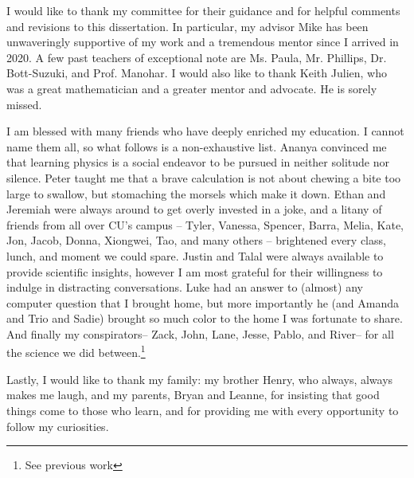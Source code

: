 I would like to thank my committee for their guidance and for helpful comments and revisions to this dissertation. In particular, my advisor Mike has been unwaveringly supportive of my work and a tremendous mentor since I arrived in 2020. A few past teachers of exceptional note are Ms. Paula, Mr. Phillips, Dr. Bott-Suzuki, and Prof. Manohar. I would also like to thank Keith Julien, who was a great mathematician and a greater mentor and advocate. He is sorely missed.

I am blessed with many friends who have deeply enriched my education. 
I cannot name them all, so what follows is a non-exhaustive list.
Ananya convinced me that learning physics is a social endeavor to be pursued in neither solitude nor silence.
Peter taught me that a brave calculation is not about chewing a bite too large to swallow, but stomaching the morsels which make it down.
Ethan and Jeremiah were always around to get overly invested in a joke, and a litany of friends from all over CU's campus -- 
Tyler, Vanessa, Spencer, Barra, Melia, Kate, Jon, Jacob, Donna, Xiongwei, Tao, and many others -- brightened every class, lunch, and moment we could spare.
Justin and Talal were always available to provide scientific insights, however I am most grateful for their willingness to indulge in distracting conversations.
 Luke had an answer to (almost) any computer question that I brought home, but more importantly he (and Amanda and Trio and Sadie) brought so much color to the home I was fortunate to share.
 And finally my conspirators-- Zack, John, Lane,  Jesse, Pablo, and River-- for all the science we did between.\footnote{See previous work}

Lastly, I would like to thank my family: my brother Henry, who always, always makes me laugh, and my parents, Bryan and Leanne, for insisting that good things come to those who learn, and for providing me with every opportunity to follow my curiosities.
